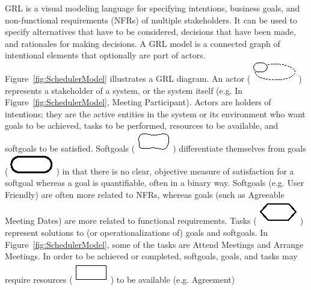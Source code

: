 GRL is a visual modeling language for specifying intentions, business goals, and non-functional requirements (NFRs) of multiple stakeholders. It can be used to specify alternatives that have to be considered, decisions that have been made, and rationales for making decisions. A GRL model is a connected graph of intentional elements that optionally are part of actors. Figure~\ref{fig:SchedulerModel} illustrates a GRL diagram. An actor (\includegraphics[scale=1]{img/actor}) represents a stakeholder of a system, or the system itself (e.g. In Figure~\ref{fig:SchedulerModel}, \textsf{Meeting Participant}). Actors are holders of intentions; they are the active entities in the system or its environment who want goals to be achieved, tasks to be performed, resources to be available, and softgoals to be satisfied. Softgoals (\includegraphics[scale=1]{img/softgoal}) differentiate themselves from goals (\includegraphics[scale=1]{img/goal}) in that there is no clear, objective measure of satisfaction for a softgoal whereas a goal is quantifiable, often in a binary way. Softgoals (e.g. \textsf{User Friendly)} are often more related to NFRs, whereas goals (such as \textsf{Agreeable Meeting Dates}) are more related to functional requirements. Tasks (\includegraphics[scale=1]{img/task}) represent solutions to (or operationalizations of) goals and softgoals. In Figure~\ref{fig:SchedulerModel}, some of the tasks are \textsf{Attend Meetings} and \textsf{Arrange Meetings}. In order to be achieved or completed, softgoals, goals, and tasks may require resources (\includegraphics[scale=1]{img/resource}) to be available (e.g. \textsf{Agreement})

